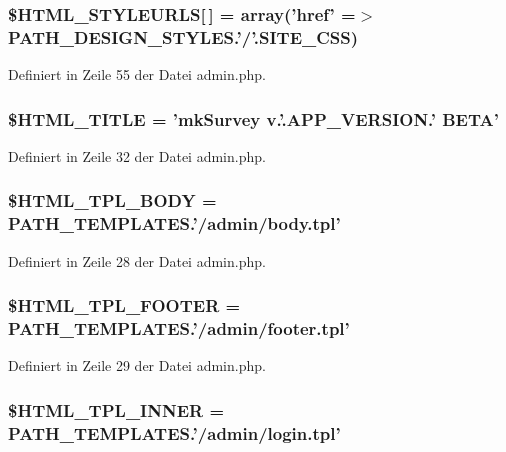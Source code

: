 \subsubsection{\setlength{\rightskip}{0pt plus 5cm}\$HTML\_\-STYLEURLS[$\,$] = array('href' =$>$ PATH\_\-DESIGN\_\-STYLES.'/'.{\bf SITE\_\-CSS})}\label{admin_8php_9ebc3f13ab7c244131c88b01336ce47e}




Definiert in Zeile 55 der Datei admin.php.
\subsubsection{\setlength{\rightskip}{0pt plus 5cm}\$HTML\_\-TITLE = 'mkSurvey v.'.APP\_\-VERSION.' BETA'}\label{admin_8php_fd08af1760011918ee8aeab27309ed7e}




Definiert in Zeile 32 der Datei admin.php.
\subsubsection{\setlength{\rightskip}{0pt plus 5cm}\$HTML\_\-TPL\_\-BODY = PATH\_\-TEMPLATES.'/admin/body.tpl'}\label{admin_8php_132a7bf90078fd9ad70b6057c8c2682a}




Definiert in Zeile 28 der Datei admin.php.
\subsubsection{\setlength{\rightskip}{0pt plus 5cm}\$HTML\_\-TPL\_\-FOOTER = PATH\_\-TEMPLATES.'/admin/footer.tpl'}\label{admin_8php_443c9b15cbcd3f66af9d26fdb7b502ba}




Definiert in Zeile 29 der Datei admin.php.
\subsubsection{\setlength{\rightskip}{0pt plus 5cm}\$HTML\_\-TPL\_\-INNER = PATH\_\-TEMPLATES.'/admin/login.tpl'}\label{admin_8php_0d0ccbfae545490b87c076e183ef6c5c}





